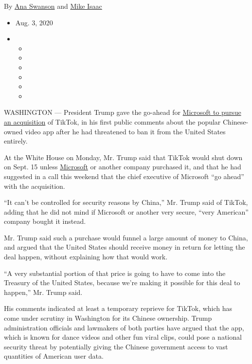 By \href{https://www.nytimes.com/by/ana-swanson}{Ana Swanson} and
\href{https://www.nytimes.com/by/mike-isaac}{Mike Isaac}

\begin{itemize}
\item
  Aug. 3, 2020
\item
  \begin{itemize}
  \item
  \item
  \item
  \item
  \item
  \item
  \end{itemize}
\end{itemize}

WASHINGTON --- President Trump gave the go-ahead for
\href{https://www.nytimes.com/2020/08/02/business/economy/trump-tiktok-china-national-security.html}{Microsoft
to pursue an acquisition} of TikTok, in his first public comments about
the popular Chinese-owned video app after he had threatened to ban it
from the United States entirely.

At the White House on Monday, Mr. Trump said that TikTok would shut down
on Sept. 15 unless
\href{https://www.nytimes.com/2020/08/03/us/navy-seal-museum-kaepernick.html}{Microsoft}
or another company purchased it, and that he had suggested in a call
this weekend that the chief executive of Microsoft ``go ahead'' with the
acquisition.

``It can't be controlled for security reasons by China,'' Mr. Trump said
of TikTok, adding that he did not mind if Microsoft or another very
secure, ``very American'' company bought it instead.

Mr. Trump said such a purchase would funnel a large amount of money to
China, and argued that the United States should receive money in return
for letting the deal happen, without explaining how that would work.

``A very substantial portion of that price is going to have to come into
the Treasury of the United States, because we're making it possible for
this deal to happen,'' Mr. Trump said.

His comments indicated at least a temporary reprieve for TikTok, which
has come under scrutiny in Washington for its Chinese ownership. Trump
administration officials and lawmakers of both parties have argued that
the app, which is known for dance videos and other fun viral clips,
could pose a national security threat by potentially giving the Chinese
government access to vast quantities of American user data.

